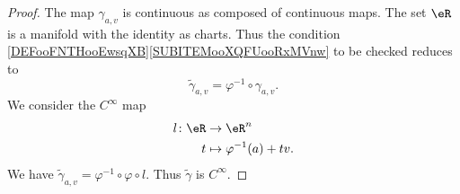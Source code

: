 \begin{proof}
    The map \( \gamma_{a,v}\) is continuous as composed of continuous maps. The set \( \eR\) is a manifold with the identity as charts. Thus the condition \ref{DEFooFNTHooEwsqXB}\ref{SUBITEMooXQFUooRxMVnw} to be checked reduces to 
    \begin{equation}
        \tilde \gamma_{a,v}=\varphi^{-1}\circ\gamma_{a,v}.
    \end{equation}
    We consider the \(  C^{\infty}\) map
    \begin{equation}
        \begin{aligned}
            l\colon \eR&\to \eR^n \\
            t&\mapsto \varphi^{-1}(a)+tv. 
        \end{aligned}
    \end{equation}
    We have \( \tilde \gamma_{a,v}=\varphi^{-1}\circ\varphi \circ l\). Thus \( \tilde \gamma\) is \(  C^{\infty}\).


\end{proof}
